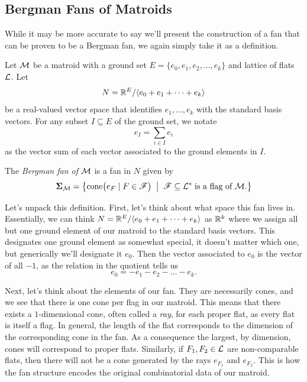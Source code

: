 \documentclass[12pt,oneside]{../../sfsuthesis}
\begin{document}
\subsection{Bergman Fans of Matroids}
While it may be more accurate to say we'll present the construction of a fan that can be proven to be a Bergman fan, we again simply take it as a definition.

\begin{definition}\th\label{def:bergmanFan}
    Let \( \mathcal{M} \) be a matroid with a ground set \( E = \{ e_0, e_1, e_2, \dots, e_k \} \) and lattice of flats \( \mathcal{L} \).
    Let
    \[
        N = \mathbb{R}^{E}/\langle e_0 + e_1 + \cdots + e_k \rangle
    \]
    be a real-valued vector space that identifies \( e_1, \dots, e_k \) with the standard basis vectors.
    For any subset \( I \subseteq E \) of the ground set, we notate
    \[
        e_I = \sum_{i \in I} e_i
    \]
    as the vector sum of each vector associated to the ground elements in \( I \).

    The \emph{Bergman fan of \( \mathcal{M} \)} is a fan in \( N \) given by
    \[
        \bm{\Sigma}_{\mathcal{M}} = \left\{
        \mathrm{cone}\big( e_F \; | \; F \in \mathscr{F} \big)
        \;\; \middle| \;\;
        \mathscr{F} \subseteq \mathcal{L}^\ast \; \text{is a flag of \(\mathcal{M}\)}.
        \right\}
    \]
\end{definition}

Let's unpack this definition.
First, let's think about what space this fan lives in.
Essentially, we can think \( N = \mathbb{R}^{E}/\langle e_0 + e_1 + \cdots + e_k \rangle \) as \( \mathbb{R}^k \) where we assign all but one ground element of our matroid to the standard basis vectors.
This designates one ground element as somewhat special, it doesn't matter which one, but generically we'll designate it \( e_0 \).
Then the vector associated to \( e_0 \) is the vector of all \( -1 \), as the relation in the quotient tells us
\[
    e_0 = -e_1 - e_2 - \dots - e_k.
\]

Next, let's think about the elements of our fan.
They are necessarily cones, and we see that there is one cone per flag in our matroid.
This means that there exists a \( 1 \)-dimensional cone, often called a \textit{ray}, for each proper flat, as every flat is itself a flag.
In general, the length of the flat corresponds to the dimension of the corresponding cone in the fan.
As a consequence the largest, by dimension, cones will correspond to proper flats.
Similarly, if \( F_1, F_2 \in \mathcal{L} \) are non-comparable flats, then there will not be a cone generated by the rays \( e_{F_1} \) and \( e_{F_2} \).
This is how the fan structure encodes the original combinatorial data of our matroid.
\end{document}
